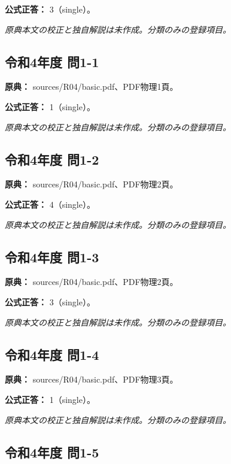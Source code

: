 \textbf{公式正答：} 3（single）。

\par\textit{原典本文の校正と独自解説は未作成。分類のみの登録項目。}

\subsection{令和4年度 問1-1}
\label{q:r04-reg-basic-1-1}

\noindent\textbf{原典：} sources/R04/basic.pdf、PDF物理1頁。

\textbf{公式正答：} 1（single）。

\par\textit{原典本文の校正と独自解説は未作成。分類のみの登録項目。}

\subsection{令和4年度 問1-2}
\label{q:r04-reg-basic-1-2}

\noindent\textbf{原典：} sources/R04/basic.pdf、PDF物理2頁。

\textbf{公式正答：} 4（single）。

\par\textit{原典本文の校正と独自解説は未作成。分類のみの登録項目。}

\subsection{令和4年度 問1-3}
\label{q:r04-reg-basic-1-3}

\noindent\textbf{原典：} sources/R04/basic.pdf、PDF物理2頁。

\textbf{公式正答：} 3（single）。

\par\textit{原典本文の校正と独自解説は未作成。分類のみの登録項目。}

\subsection{令和4年度 問1-4}
\label{q:r04-reg-basic-1-4}

\noindent\textbf{原典：} sources/R04/basic.pdf、PDF物理3頁。

\textbf{公式正答：} 1（single）。

\par\textit{原典本文の校正と独自解説は未作成。分類のみの登録項目。}

\subsection{令和4年度 問1-5}
\label{q:r04-reg-basic-1-5}

